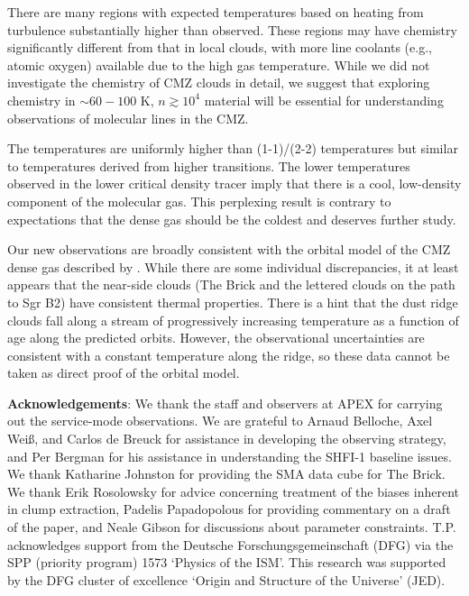 There are many regions with expected temperatures based on heating from
turbulence substantially higher than observed.  These
regions may have chemistry significantly different from that
in local clouds, with more line coolants (e.g., atomic oxygen) available due to
the high gas temperature.  While we did not investigate the chemistry of CMZ
clouds in detail, we suggest that exploring chemistry in
$\sim60-100$ K, $n\gtrsim10^4$ \percc material will be essential for understanding
observations of molecular lines in the CMZ.

The \formaldehyde temperatures are uniformly higher than \ammonia (1-1)/(2-2)
temperatures but similar to temperatures derived from higher \ammonia
transitions.  The lower temperatures observed in the lower critical density
tracer imply that there is a cool, low-density component of the molecular gas.
This perplexing result is contrary to expectations that the dense gas should be
the coldest and deserves further study.

Our new observations are broadly consistent with the orbital model of the CMZ
dense gas described by \citet{Kruijssen2015a}.  While there are some individual
discrepancies, it at least appears that the near-side clouds (The Brick and the
lettered clouds on the path to Sgr B2) have consistent thermal properties.
There is a hint that the dust ridge clouds fall along a stream of progressively
increasing temperature as a function of age along the predicted orbits.  However,
the observational uncertainties are consistent with a constant temperature along
the ridge, so these data cannot be taken as direct proof of the orbital model.


\textbf{Acknowledgements}:
We thank the staff and observers at APEX for carrying out the service-mode
observations.  We are grateful to Arnaud Belloche, Axel Wei{\ss}, and Carlos de
Breuck for assistance in developing the observing strategy, and Per Bergman for
his assistance in understanding the SHFI-1 baseline issues.
We thank Katharine Johnston for providing the SMA \para \threetwoone
data cube for The Brick.
We thank Erik Rosolowsky for advice concerning treatment of the biases inherent
in clump extraction, Padelis Papadopolous for providing commentary on a draft
of the paper, and Neale Gibson for discussions about parameter constraints.
T.P. acknowledges support from the Deutsche
Forschungsgemeinschaft (DFG) via
the SPP (priority program) 1573 `Physics of the ISM'.
This research was supported by the DFG cluster of excellence `Origin and
Structure of the Universe' (JED).

